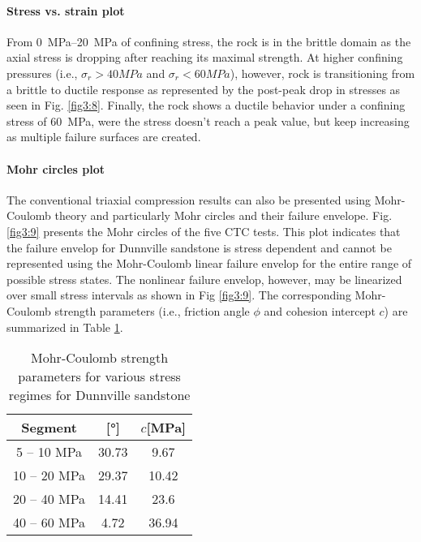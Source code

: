\paragraph{Stress vs. strain plot} From \SIrange{0}{20}{MPa} of confining stress, the rock is in the brittle domain as the axial stress is dropping after reaching its maximal strength. At higher confining pressures (i.e., $\sigma_r > 40 \si{MPa}$ and $\sigma_r < 60 \si{MPa}$), however, rock is transitioning from a brittle to ductile response as represented by the post-peak drop in stresses as seen in Fig. \ref{fig3:8}. Finally, the rock shows a ductile behavior under a confining stress of \SI{60}{MPa}, were the stress doesn’t reach a peak value, but keep increasing as multiple failure surfaces are created.

\paragraph{Mohr circles plot} 
The conventional triaxial compression results can also be presented using Mohr-Coulomb theory and particularly Mohr circles and their failure envelope. Fig. \ref{fig3:9} presents the Mohr circles of the five CTC tests. This plot indicates that the failure envelop for Dunnville sandstone is stress dependent and cannot be represented using the Mohr-Coulomb linear failure envelop for the entire range of possible stress states. The nonlinear failure envelop, however, may be linearized over small stress intervals as shown in Fig \ref{fig3:9}. The corresponding Mohr-Coulomb strength parameters (i.e., friction angle $\phi$  and cohesion intercept $c$) are summarized in Table \ref{tb3:MC-param}.

\begin{table}
    \centering
    \begin{tabular}{ccc}
        \hline
        Segment & [\si{\degree}] & $c$[\si{MPa}] \\
        \hline
        \hline
        5 – 10 MPa  & 30.73 & 9.67   \\ 
        10 – 20 MPa & 29.37 & 10.42  \\ 
        20 – 40 MPa & 14.41 & 23.6   \\ 
        40 – 60 MPa & 4.72  & 36.94  \\
        \hline
    \end{tabular}
    \caption{Mohr-Coulomb strength parameters for various stress regimes for Dunnville sandstone}
    \label{tb3:MC-param}
\end{table}

